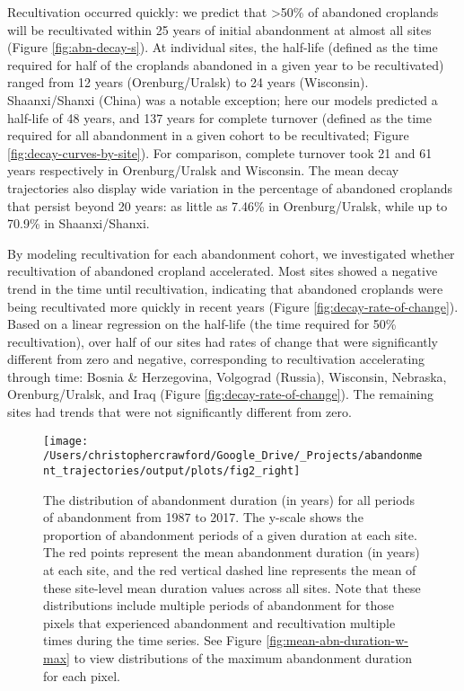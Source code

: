 \documentclass[9pt,twocolumn,twoside,lineno]{pnas-new}
\begin{document}
Recultivation occurred quickly: we predict that \textgreater50\% of abandoned croplands will be recultivated within 25 years of initial abandonment at almost all sites (Figure \ref{fig:abn-decay-s}).
At individual sites, the half-life (defined as the time required for half of the croplands abandoned in a given year to be recultivated) ranged from 12 years (Orenburg/Uralsk) to 24 years (Wisconsin).
Shaanxi/Shanxi (China) was a notable exception; here our models predicted a half-life of 48 years, and 137 years for complete turnover (defined as the time required for all abandonment in a given cohort to be recultivated; Figure \ref{fig:decay-curves-by-site}).
For comparison, complete turnover took 21 and 61 years respectively in Orenburg/Uralsk and Wisconsin.
The mean decay trajectories also display wide variation in the percentage of abandoned croplands that persist beyond 20 years: as little as 7.46\% in Orenburg/Uralsk, while up to 70.9\% in Shaanxi/Shanxi.

By modeling recultivation for each abandonment cohort, we investigated whether recultivation of abandoned cropland accelerated.
Most sites showed a negative trend in the time until recultivation, indicating that abandoned croplands were being recultivated more quickly in recent years (Figure \ref{fig:decay-rate-of-change}).
Based on a linear regression on the half-life (the time required for 50\% recultivation), over half of our sites had rates of change that were significantly different from zero and negative, corresponding to recultivation accelerating through time: Bosnia \& Herzegovina, Volgograd (Russia), Wisconsin, Nebraska, Orenburg/Uralsk, and Iraq (Figure \ref{fig:decay-rate-of-change}).
The remaining sites had trends that were not significantly different from zero.



\begin{figure}
\texttt{[image: /Users/christophercrawford/Google\_Drive/\_Projects/abandonment\_trajectories/output/plots/fig2\_right]} \caption{The distribution of abandonment duration (in years) for all periods of abandonment from 1987 to 2017. The y-scale shows the proportion of abandonment periods of a given duration at each site. The red points represent the mean abandonment duration (in years) at each site, and the red vertical dashed line represents the mean of these site-level mean duration values across all sites. Note that these distributions include multiple periods of abandonment for those pixels that experienced abandonment and recultivation multiple times during the time series. See Figure \ref{fig:mean-abn-duration-w-max} to view distributions of the maximum abandonment duration for each pixel.}\label{fig:mean-abn-duration}
\end{figure}
\end{document}
